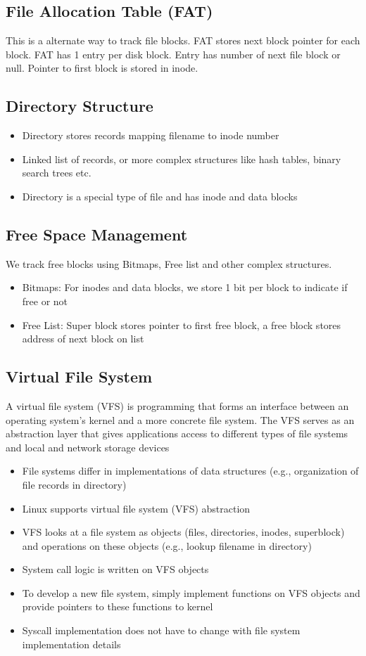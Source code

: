 \documentclass{article}
\begin{document}
\subsection{File Allocation Table (FAT)}
This is a alternate way to track file blocks. FAT stores next block pointer for each block. FAT has 1 entry per disk block. Entry has number of next file block or null. Pointer to first block is stored in inode.
\subsection{Directory Structure}
\begin{itemize}
    \item Directory stores records mapping filename to inode number
    \item Linked list of records, or more complex structures like hash tables, binary search trees etc.
    \item Directory is a special type of file and has inode and data blocks
\end{itemize}
\subsection{Free Space Management}
We track free blocks using Bitmaps, Free list and other complex structures.
\begin{itemize}
    \item Bitmaps: For inodes and data blocks, we store 1 bit per block to indicate if free or not
    \item Free List: Super block stores pointer to first free block, a free block stores address of next block on list
\end{itemize}
\subsection{Virtual File System}
A virtual file system (VFS) is programming that forms an interface between an operating system's kernel and a more concrete file system. The VFS serves as an abstraction layer that gives applications access to different types of file systems and local and network storage devices
\begin{itemize}
    \item File systems differ in implementations of data structures (e.g., organization of file records in directory)
    \item Linux supports virtual file system (VFS) abstraction
    \item VFS looks at a file system as objects (files, directories, inodes, superblock) and operations on these objects (e.g., lookup filename in directory)
    \item System call logic is written on VFS objects
    \item To develop a new file system, simply implement functions on VFS objects and provide pointers to these functions to kernel
    \item Syscall implementation does not have to change with file system implementation details
\end{itemize}
\end{document}
